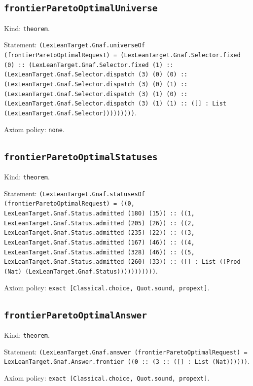 \documentclass[11pt]{article}
\begin{document}
\subsection*{\texttt{frontierParetoOptimalUniverse}}
\noindent Kind: \texttt{theorem}.\par
\noindent Statement: \texttt{(LexLeanTarget.Gnaf.universeOf (frontierParetoOptimalRequest) = (LexLeanTarget.Gnaf.Selector.fixed (0) :: (LexLeanTarget.Gnaf.Selector.fixed (1) :: (LexLeanTarget.Gnaf.Selector.dispatch (3) (0) (0) :: (LexLeanTarget.Gnaf.Selector.dispatch (3) (0) (1) :: (LexLeanTarget.Gnaf.Selector.dispatch (3) (1) (0) :: (LexLeanTarget.Gnaf.Selector.dispatch (3) (1) (1) :: ([] : List (LexLeanTarget.Gnaf.Selector)))))))))}.\par
\noindent Axiom policy: \texttt{none}.\par
\subsection*{\texttt{frontierParetoOptimalStatuses}}
\noindent Kind: \texttt{theorem}.\par
\noindent Statement: \texttt{(LexLeanTarget.Gnaf.statusesOf (frontierParetoOptimalRequest) = ((0, LexLeanTarget.Gnaf.Status.admitted (180) (15)) :: ((1, LexLeanTarget.Gnaf.Status.admitted (205) (26)) :: ((2, LexLeanTarget.Gnaf.Status.admitted (235) (22)) :: ((3, LexLeanTarget.Gnaf.Status.admitted (167) (46)) :: ((4, LexLeanTarget.Gnaf.Status.admitted (328) (46)) :: ((5, LexLeanTarget.Gnaf.Status.admitted (260) (33)) :: ([] : List ((Prod (Nat) (LexLeanTarget.Gnaf.Status)))))))))))}.\par
\noindent Axiom policy: \texttt{exact [Classical.choice, Quot.sound, propext]}.\par
\subsection*{\texttt{frontierParetoOptimalAnswer}}
\noindent Kind: \texttt{theorem}.\par
\noindent Statement: \texttt{(LexLeanTarget.Gnaf.answer (frontierParetoOptimalRequest) = LexLeanTarget.Gnaf.Answer.frontier ((0 :: (3 :: ([] : List (Nat))))))}.\par
\noindent Axiom policy: \texttt{exact [Classical.choice, Quot.sound, propext]}.\par
\end{document}

